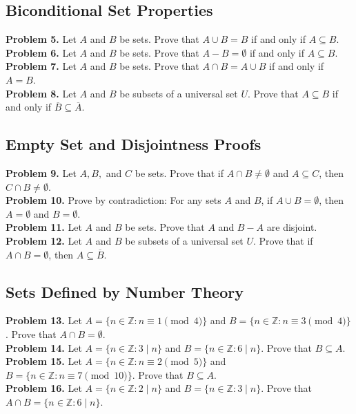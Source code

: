 \documentclass[11pt]{article}
\begin{document}
\subsection{Biconditional Set Properties}
\noindent \textbf{Problem 5.} Let $A$ and $B$ be sets. Prove that $A \cup B = B$ if and only if $A \subseteq B$. \\
\textbf{Problem 6.} Let $A$ and $B$ be sets. Prove that $A - B = \emptyset$ if and only if $A \subseteq B$. \\
\textbf{Problem 7.} Let $A$ and $B$ be sets. Prove that $A \cap B = A \cup B$ if and only if $A = B$. \\
\textbf{Problem 8.} Let $A$ and $B$ be subsets of a universal set $U$. Prove that $A \subseteq B$ if and only if $\overline{B} \subseteq \overline{A}$.

\subsection{Empty Set and Disjointness Proofs}
\noindent \textbf{Problem 9.} Let $A, B,$ and $C$ be sets. Prove that if $A \cap B \neq \emptyset$ and $A \subseteq C$, then $C \cap B \neq \emptyset$. \\
\textbf{Problem 10.} Prove by contradiction: For any sets $A$ and $B$, if $A \cup B = \emptyset$, then $A = \emptyset$ and $B = \emptyset$. \\
\textbf{Problem 11.} Let $A$ and $B$ be sets. Prove that $A$ and $B - A$ are disjoint. \\
\textbf{Problem 12.} Let $A$ and $B$ be subsets of a universal set $U$. Prove that if $A \cap B = \emptyset$, then $A \subseteq \overline{B}$.

\subsection{Sets Defined by Number Theory}
\noindent \textbf{Problem 13.} Let $A = \{n \in \mathbb{Z} : n \equiv 1 \pmod 4\}$ and $B = \{n \in \mathbb{Z} : n \equiv 3 \pmod 4\}$. Prove that $A \cap B = \emptyset$. \\
\textbf{Problem 14.} Let $A = \{n \in \mathbb{Z} : 3 \mid n\}$ and $B = \{n \in \mathbb{Z} : 6 \mid n\}$. Prove that $B \subseteq A$. \\
\textbf{Problem 15.} Let $A = \{n \in \mathbb{Z} : n \equiv 2 \pmod 5\}$ and $B = \{n \in \mathbb{Z} : n \equiv 7 \pmod{10}\}$. Prove that $B \subseteq A$. \\
\textbf{Problem 16.} Let $A = \{n \in \mathbb{Z} : 2 \mid n\}$ and $B = \{n \in \mathbb{Z} : 3 \mid n\}$. Prove that $A \cap B = \{n \in \mathbb{Z} : 6 \mid n\}$.
\end{document}
